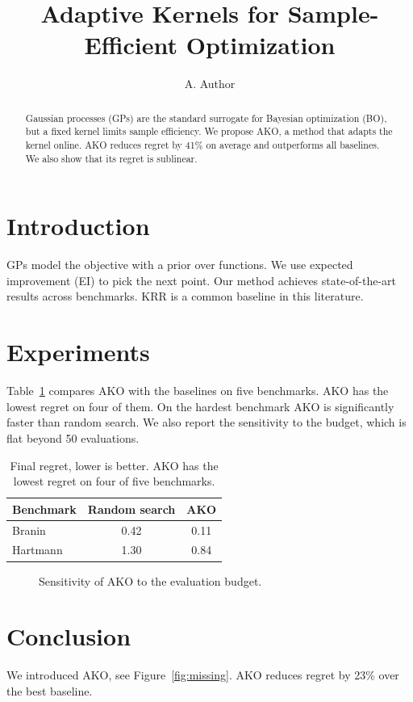 \documentclass{article}
\begin{document}
\title{Adaptive Kernels for Sample-Efficient Optimization}
\author{A. Author}
\maketitle

\begin{abstract}
Gaussian processes (GPs) are the standard surrogate for Bayesian optimization (BO), but a fixed kernel limits
sample efficiency. We propose AKO, a method that adapts the kernel online. AKO reduces regret by 41\% on
average and outperforms all baselines. We also show that its regret is sublinear.
\end{abstract}

\section{Introduction}
GPs model the objective with a prior over functions. We use expected improvement (EI) to pick the next point.
Our method achieves state-of-the-art results across benchmarks. KRR is a common baseline in this literature.



\section{Experiments}
Table~\ref{tab:main} compares AKO with the baselines on five benchmarks. AKO has the lowest regret on four of them.
On the hardest benchmark AKO is significantly faster than random search.
We also report the sensitivity to the budget, which is flat beyond 50 evaluations.

\begin{table}[t]
\caption{Final regret, lower is better. AKO has the lowest regret on four of five benchmarks.}
\label{tab:main}
\centering
\begin{tabular}{lcc}
\toprule
Benchmark & Random search & AKO \\
\midrule
Branin & 0.42 & 0.11 \\
Hartmann & 1.30 & 0.84 \\
\bottomrule
\end{tabular}
\end{table}

\begin{figure}[t]
\caption{Sensitivity of AKO to the evaluation budget.}
\label{fig:budget}
\end{figure}

\section{Conclusion}
We introduced AKO, see Figure~\ref{fig:missing}. AKO reduces regret by 23\% over the best baseline.
\end{document}
